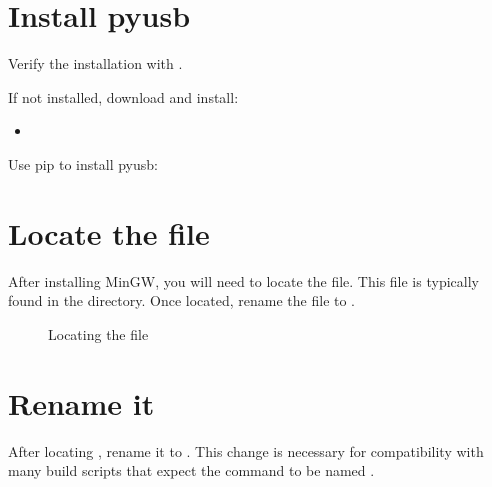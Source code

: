 \documentclass[letterpaper,10pt,english]{sphinxmanual}
\begin{document}
\begin{sphinxVerbatim}[commandchars=\\\{\}]
\PYGZbs{}\PYGZbs{}
\end{sphinxVerbatim}


\section{Install pyusb}
\label{\detokenize{install_windows:install-pyusb}}
\sphinxAtStartPar
Verify the installation with .

\sphinxAtStartPar
If not installed, download and install:
\begin{itemize}
\item {} 
\sphinxAtStartPar
{}

\end{itemize}

\sphinxAtStartPar
Use pip to install pyusb:

\begin{sphinxVerbatim}[commandchars=\\\{\}]
  
\end{sphinxVerbatim}


\section{Locate the file}
\label{\detokenize{install_windows:locate-the-file}}
\sphinxAtStartPar
After installing MinGW, you will need to locate the  file. This file is typically found in the  directory. Once located, rename the file to .

\begin{figure}[htbp]
\centering
\capstart

\noindent{}
\caption{Locating the  file}\label{\detokenize{install_windows:id2}}\label{\detokenize{install_windows:make-file}}\end{figure}


\section{Rename it}
\label{\detokenize{install_windows:rename-it}}
\sphinxAtStartPar
After locating , rename it to . This change is necessary for compatibility with many build scripts that expect the command to be named .
\end{document}

